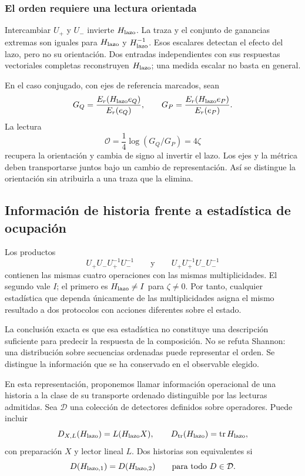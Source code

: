 \subsubsection{El orden requiere una lectura orientada}
\label{md:comp:orden-orientado}

Intercambiar \(U_+\) y \(U_-\) invierte \(H_{\rm lazo}\).
La traza y el conjunto de ganancias extremas son iguales para
\(H_{\rm lazo}\) y \(H_{\rm lazo}^{-1}\). Esos escalares detectan
el efecto del lazo, pero no su orientación. Dos entradas
independientes con sus respuestas vectoriales completas reconstruyen
\(H_{\rm lazo}\); una medida escalar no basta en general.

En el caso conjugado, con ejes de referencia marcados, sean
\[
 G_Q=\frac{E_r(H_{\rm lazo}e_Q)}{E_r(e_Q)},\qquad
 G_P=\frac{E_r(H_{\rm lazo}e_P)}{E_r(e_P)}.
\]
La lectura
\begin{equation}
 \mathcal O=\frac14\log(G_Q/G_P)=4\zeta
 \label{md:comp:lector-orientado}
\end{equation}
recupera la orientación y cambia de signo al invertir el lazo.
Los ejes y la métrica deben transportarse juntos bajo un cambio
de representación. Así se distingue la orientación sin atribuirla
a una traza que la elimina.

\subsection{Información de historia frente a estadística de ocupación}
\label{md:comp:informacion}

Los productos
\[
 U_+U_-U_+^{-1}U_-^{-1}
 \qquad\text{y}\qquad
 U_+U_+^{-1}U_-U_-^{-1}
\]
contienen las mismas cuatro operaciones con las mismas multiplicidades.
El segundo vale \(I\); el primero es \(H_{\rm lazo}\ne I\) para
\(\zeta\ne0\). Por tanto, cualquier estadística que dependa
únicamente de las multiplicidades asigna el mismo resultado a dos
protocolos con acciones diferentes sobre el estado.

La conclusión exacta es que esa estadística no constituye una
descripción suficiente para predecir la respuesta de la composición.
No se refuta Shannon: una distribución sobre secuencias ordenadas
puede representar el orden. Se distingue la información que se ha
conservado en el observable elegido.

\begin{definition}
\label{md:comp:def-informacion}
En esta representación, proponemos llamar información operacional de
una historia a la clase de su transporte ordenado distinguible por las
lecturas admitidas. Sea \(\mathcal D\) una colección de detectores
definidos sobre operadores. Puede incluir
\[
 D_{X,L}(H_{\rm lazo})=L(H_{\rm lazo}X),
 \qquad D_{\rm tr}(H_{\rm lazo})=\operatorname{tr}H_{\rm lazo},
\]
con preparación \(X\) y lector lineal \(L\).
Dos historias son equivalentes si
\[
 D(H_{{\rm lazo},1})=D(H_{{\rm lazo},2})
 \qquad\text{para todo }D\in\mathcal D.
\]
\end{definition}

